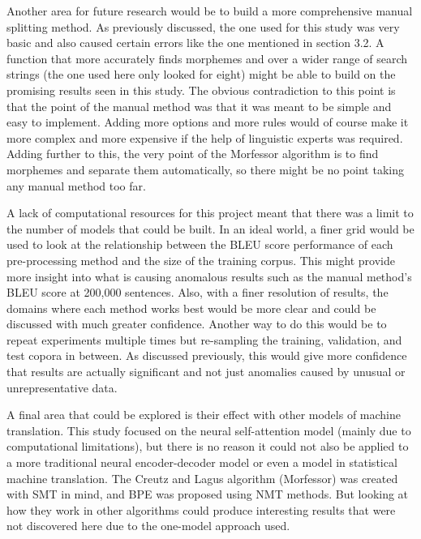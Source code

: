 \documentclass[11pt]{article}
\begin{document}
\bigskip

Another area for future research would be to build a more comprehensive manual splitting method. As previously discussed, the one used for this study was very basic and also caused certain errors like the one mentioned in section 3.2. A function that more accurately finds morphemes and over a wider range of search strings (the one used here only looked for eight) might be able to build on the promising results seen in this study. The obvious contradiction to this point is that the point of the manual method was that it was meant to be simple and easy to implement. Adding more options and more rules would of course make it more complex and more expensive if the help of linguistic experts was required. Adding further to this, the very point of the Morfessor algorithm is to find morphemes and separate them automatically, so there might be no point taking any manual method too far.

\bigskip

A lack of computational resources for this project meant that there was a limit to the number of models that could be built. In an ideal world, a finer grid would be used to look at the relationship between the BLEU score performance of each pre-processing method and the size of the training corpus. This might provide more insight into what is causing anomalous results such as the manual method's BLEU score at 200,000 sentences. Also, with a finer resolution of results, the domains where each method works best would be more clear and could be discussed with much greater confidence. Another way to do this would be to repeat experiments multiple times but re-sampling the training, validation, and test copora in between. As discussed previously, this would give more confidence that results are actually significant and not just anomalies caused by unusual or unrepresentative data.

\bigskip

A final area that could be explored is their effect with other models of machine translation. This study focused on the neural self-attention model (mainly due to computational limitations), but there is no reason it could not also be applied to a more traditional neural encoder-decoder model or even a model in statistical machine translation. The Creutz and Lagus \citeyearpar{creutz-lagus-2002-unsupervised} algorithm (Morfessor) was created with SMT in mind, and BPE was proposed using NMT methods. But looking at how they work in other algorithms could produce interesting results that were not discovered here due to the one-model approach used.
\end{document}
